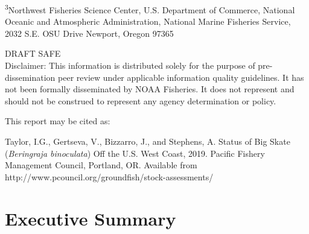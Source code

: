 \documentclass[12pt,]{article}
\begin{document}
\begin{center}
\vspace{.3cm}

\textsuperscript{3}Northwest Fisheries Science Center, U.S. Department of Commerce, National Oceanic and Atmospheric Administration, National Marine Fisheries Service, 2032 S.E. OSU Drive Newport, Oregon 97365


\vspace{.5cm}

\vfill
DRAFT SAFE\\
Disclaimer: This information is distributed solely for the purpose of pre-dissemination
peer review under applicable information quality guidelines. It has not been formally
disseminated by NOAA Fisheries. It does not represent and should not be construed to
represent any agency determination or policy. 

\vspace{.3cm}


\newpage{\thispagestyle{empty}}

\vspace*{\fill}
\begin{flushleft}
This report may be cited as:

Taylor, I.G., Gertseva, V., Bizzarro, J., and Stephens, A. Status of Big Skate (\emph{Beringraja binoculata}) Off the U.S. West Coast, 2019. Pacific Fishery Management Council, Portland, OR. Available from http://www.pcouncil.org/groundfish/stock-assessments/
\end{flushleft}

\maketitle

\setcounter{page}{1}
\end{center}

{
\setcounter{tocdepth}{4}
\tableofcontents
}
\setlength{\parskip}{5mm plus1mm minus1mm}
\pagebreak


\renewcommand{\thefigure}{\alph{figure}}
\renewcommand{\thetable}{\alph{table}}

\hypertarget{executive-summary}{%
\section*{Executive Summary}\label{executive-summary}}
\end{document}

